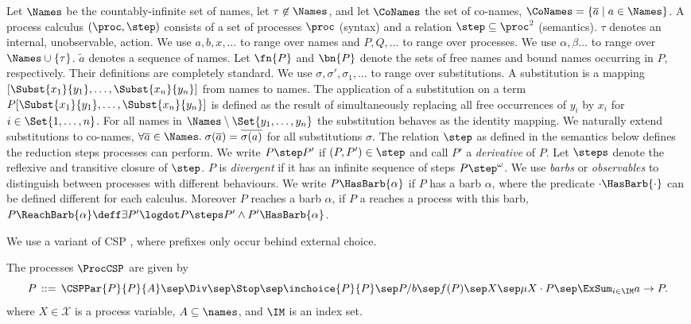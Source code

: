 \documentclass[]{eptcs}
\begin{document}
Let $\Names$ be the countably-infinite set of names, let $\tau \not\in \Names$, and let $\CoNames$ the set of co-names, \ie $\CoNames = \{ \overline{a} \mid a \in \Names \}$.
A process calculus $ \left( \proc, \step \right) $ consists of a set of processes $ \proc $ (syntax) and a relation $ {\step} \subseteq \proc^2 $ (semantics).
$ \tau $ denotes an internal, \ie unobservable, action.
We use $ a, b, x, \ldots $ to range over names and $ P, Q, \ldots $ to range over processes.
We use $\alpha, \beta \ldots$ to range over $\Names \cup \{\tau\}$.
$\tilde{a}$ denotes a sequence of names.
Let $ \fn{P} $ and $ \bn{P} $  denote the sets of free names and bound names occurring in $P$, respectively.
Their definitions are completely standard.
We use $\sigma, \sigma', \sigma_{1}, \ldots$ to range over substitutions.
A substitution is a mapping $[\Subst{x_{1}}{y_{1}}, \ldots ,\Subst{x_{n}}{y_{n}}]$ from names to names.
The application of a substitution on a term $P[\Subst{x_{1}}{y_{1}}, \ldots ,\Subst{x_{n}}{y_{n}}]$ is defined as the result of simultaneously replacing all free occurrences of $y_{i}$ by $x_{i}$ for $i \in \Set{1, \ldots, n}$.
For all names in $\Names \setminus \Set{y_{1}, \ldots, y_{n}}$ the substitution behaves as the identity mapping.
We naturally extend substitutions to co-names, \ie $\forall \overline{a} \in \Names.\; \sigma(\overline{a}) = \overline{\sigma(a)}$ for all substitutions $\sigma$.
The relation $\step$ as defined in the semantics below defines the reduction steps processes can perform. We write $ P \step P' $ if $ (P, P') \in \step $ and call $ P' $ a \emph{derivative} of $ P $.
Let $ \steps $ denote the reflexive and transitive closure of $ \step $.
$ P $ is \emph{divergent} if it has an infinite sequence of steps $ P \step^{\omega} $.
We use \emph{barbs} or \emph{observables} to distinguish between processes with different behaviours. We write $ P\HasBarb{\alpha} $ if $ P $ has a barb $ \alpha $, where the predicate $ \cdot\HasBarb{\cdot} $ can be defined different for each calculus. Moreover $ P $ reaches a barb $ \alpha $, if $ P $ a reaches a process with this barb, \ie $ P\ReachBarb{\alpha} \deff \exists P'\logdot P \steps P' \wedge P'\HasBarb{\alpha} $.

We use a variant of CSP \cite{hoare:78csp}, where prefixes only occur behind external choice.
\begin{definition}\label{CSPSyntax}
The processes $\ProcCSP$ are given by
$$P \;\mathop{::=}\; \CSPPar{P}{P}{A} \sep \Div \sep \Stop \sep \inchoice{P}{P} \sep P/b \sep f(P) \sep X \sep \mu X \cdot P \sep \textstyle{\ExSum_{i \in \IM}} a \rightarrow P.$$
	where $X \in \mathcal{X}$ is a process variable, $ A \subseteq \names $, and $ \IM $ is an index set.
\end{definition}
\end{document}
